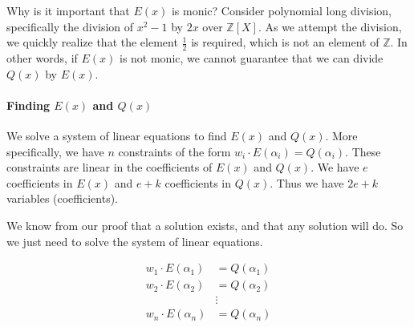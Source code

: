 \begin{notice}{Why is it important that $E(x)$ is monic?}
    Consider polynomial long division, specifically 
    the division of $x^2-1$ by $2x$ over $\mathbb{Z}[X]$. 
    As we attempt the division, we quickly realize that the element 
    $\frac{1}{2}$ is required, which is not an element of $\mathbb{Z}$. 
    In other words, if $E(x)$ is not monic, we cannot guarantee 
    that we can divide $Q(x)$ by $E(x)$.
\end{notice}

\paragraph{Finding $E(x)$ and $Q(x)$}

We solve a system of linear equations to find $E(x)$ and $Q(x)$.
More specifically, we have $n$ constraints of the form $w_i\cdot E(\alpha_i)=Q(\alpha_i)$.
These constraints are linear in the coefficients of $E(x)$ and $Q(x)$.
We have $e$ coefficients in $E(x)$ and $e+k$ coefficients in $Q(x)$. Thus 
we have $2e+k$ variables (coefficients).

We know from our proof that a solution exists, and that any solution will do.
So we just need to solve the system of linear equations.

\begin{align*}
    w_1\cdot E(\alpha_1) &= Q(\alpha_1)\\
    w_2\cdot E(\alpha_2) &= Q(\alpha_2)\\
    &\vdots\\
    w_n\cdot E(\alpha_n) &= Q(\alpha_n)\\
\end{align*}


